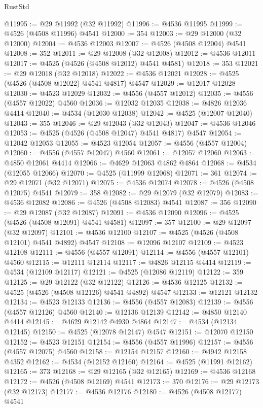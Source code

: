 \begin{lexlean}{RustStd}
\begin{coremodule}
{\begin{coremodule}
{{{{{{{{{{{{{{{{{{{{{{{{{{{{{{{{{{{{{{{{{{{{{{{{{{{{{{{@11995 := @29 @11992 (@32 @11992)
@11996 := @4536 @11995
@11999 := @4526 (@4508 @11996) @4541
@12000 := 354
@12003 := @29 @12000 (@32 @12000)
@12004 := @4536 @12003
@12007 := @4526 (@4508 @12004) @4541
@12008 := 352
@12011 := @29 @12008 (@32 @12008)
@12012 := @4536 @12011
@12017 := @4525 (@4526 (@4508 @12012) @4541 @4581)
@12018 := 353
@12021 := @29 @12018 (@32 @12018)
@12022 := @4536 @12021
@12028 := @4525 (@4526 (@4508 @12022) @4541 @4817) @4547
@12029 := @12017 @12028
@12030 := @4523 @12029
@12032 := @4556 (@4557 @12012)
@12035 := @4556 (@4557 @12022) @4560
@12036 := @12032 @12035
@12038 := @4826 @12036 @4414
@12040 := @4534 (@12030 @12038)
@12042 := @4525 (@12007 @12040)
@12043 := 355
@12046 := @29 @12043 (@32 @12043)
@12047 := @4536 @12046
@12053 := @4525 (@4526 (@4508 @12047) @4541 @4817) @4547
@12054 := @12042 @12053
@12055 := @4523 @12054
@12057 := @4556 (@4557 @12004)
@12060 := @4556 (@4557 @12047) @4560
@12061 := @12057 @12060
@12063 := @4850 @12061 @4414
@12066 := @4629 @12063 @4862 @4864
@12068 := @4534 (@12055 @12066)
@12070 := @4525 (@11999 @12068)
@12071 := 361
@12074 := @29 @12071 (@32 @12071)
@12075 := @4536 @12074
@12078 := @4526 (@4508 @12075) @4541
@12079 := 358
@12082 := @29 @12079 (@32 @12079)
@12083 := @4536 @12082
@12086 := @4526 (@4508 @12083) @4541
@12087 := 356
@12090 := @29 @12087 (@32 @12087)
@12091 := @4536 @12090
@12096 := @4525 (@4526 (@4508 @12091) @4541 @4581)
@12097 := 357
@12100 := @29 @12097 (@32 @12097)
@12101 := @4536 @12100
@12107 := @4525 (@4526 (@4508 @12101) @4541 @4892) @4547
@12108 := @12096 @12107
@12109 := @4523 @12108
@12111 := @4556 (@4557 @12091)
@12114 := @4556 (@4557 @12101) @4560
@12115 := @12111 @12114
@12117 := @4826 @12115 @4414
@12119 := @4534 (@12109 @12117)
@12121 := @4525 (@12086 @12119)
@12122 := 359
@12125 := @29 @12122 (@32 @12122)
@12126 := @4536 @12125
@12132 := @4525 (@4526 (@4508 @12126) @4541 @4892) @4547
@12133 := @12121 @12132
@12134 := @4523 @12133
@12136 := @4556 (@4557 @12083)
@12139 := @4556 (@4557 @12126) @4560
@12140 := @12136 @12139
@12142 := @4850 @12140 @4414
@12145 := @4629 @12142 @4930 @4864
@12147 := @4534 (@12134 @12145)
@12150 := @4525 (@12078 @12147) @4547
@12151 := @12070 @12150
@12152 := @4523 @12151
@12154 := @4556 (@4557 @11996)
@12157 := @4556 (@4557 @12075) @4560
@12158 := @12154 @12157
@12160 := @4942 @12158 @4352
@12162 := @4534 (@12152 @12160)
@12164 := @4525 (@11991 @12162)
@12165 := 373
@12168 := @29 @12165 (@32 @12165)
@12169 := @4536 @12168
@12172 := @4526 (@4508 @12169) @4541
@12173 := 370
@12176 := @29 @12173 (@32 @12173)
@12177 := @4536 @12176
@12180 := @4526 (@4508 @12177) @4541
}}}}}}}}}}}}}}}}}}}}}}}}}}}}}}}}}}}}}}}}}}}}}}}}}}}}}}}
\end{coremodule}}
\end{coremodule}
\end{lexlean}
